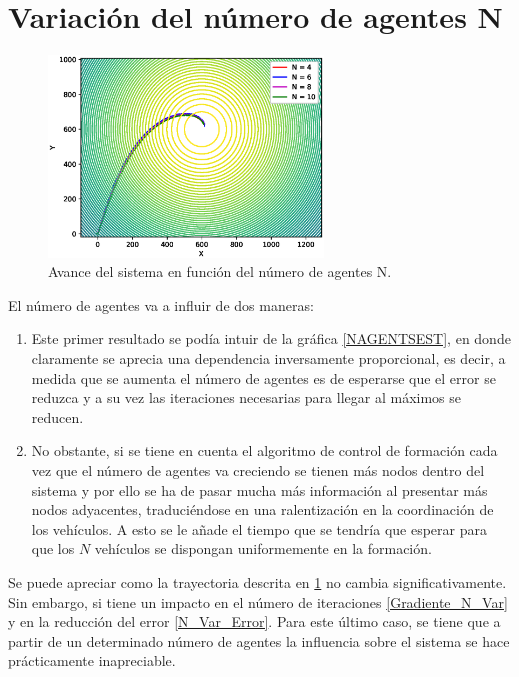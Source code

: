 \section{Variación del número de agentes N}

\begin{figure}[H]
\centering
\includegraphics[width=0.65\textwidth]{figures/N_Var_R_50/Figure_1.eps}
\caption{Avance del sistema en función del número de agentes N.} \label{N_Var}
\end{figure}

El número de agentes va a influir de dos maneras: 

\begin{enumerate}
	\item Este primer resultado se podía intuir de la gráfica \ref{NAGENTSEST}, en donde claramente se aprecia una dependencia inversamente proporcional, es decir, a medida que se aumenta el número de agentes es de esperarse que el error se reduzca y a su vez las iteraciones necesarias para llegar al máximos se reducen.
	\item No obstante, si se tiene en cuenta el algoritmo de control de formación  cada vez que el número de agentes va creciendo se tienen más nodos dentro del sistema y por ello se ha de pasar mucha más información al presentar más nodos adyacentes, traduciéndose en una ralentización en la coordinación de los vehículos. A esto se le añade el tiempo que se tendría que esperar para que los $N$ vehículos se dispongan uniformemente en la formación.
\end{enumerate}

Se puede apreciar como la trayectoria descrita en \ref{N_Var} no cambia significativamente. Sin embargo, si tiene un impacto en el número de iteraciones \ref{Gradiente_N_Var} y en la reducción del error \ref{N_Var_Error}. Para este último caso, se tiene que a partir de un determinado número de agentes la influencia sobre el sistema se hace prácticamente inapreciable.

